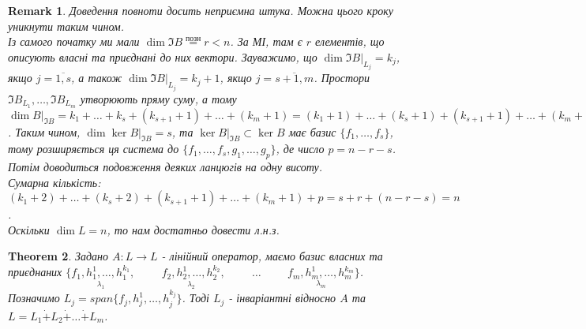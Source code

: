 \documentclass[a4paper, 10pt]{article}
\theoremstyle{theoremdd}
\newtheorem{theorem}{Theorem}[subsection]
\newtheorem{remark}[theorem]{Remark}
\begin{document}
\begin{remark}
Доведення повноти досить неприємна штука. Можна цього кроку уникнути таким чином.\\
Із самого початку ми мали $\dim \Im B \overset{\text{позн}}{=} r < n$. За МІ, там є $r$ елементів, що описують власні та приєднані до них вектори. Зауважимо, що $\dim \Im B|_{L_j} = k_j$, якщо $j = \overline{1,s}$, а також $\dim \Im B|_{L_j} = k_j + 1$, якщо $j = \overline{s+1,m}$. Простори $\Im B_{L_1},\dots, \Im B_{L_m}$ утворюють пряму суму, а тому $\dim B|_{\Im B} = k_1 + \dots + k_s + (k_{s+1}+1) + \dots + (k_m+1) = (k_1 + 1) + \dots + (k_s + 1) + (k_{s+1}+1) + \dots + (k_m+1) - s = r - s$. Таким чином, $\dim \ker B|_{\Im B} = s$, та $\ker B|_{\Im B} \subset \ker B$ має базис $\{f_1,\dots,f_s\}$, тому розширяється ця система до $\{f_1,\dots,f_s, g_1,\dots,g_p\}$, де число $p = n-r-s$.\\
Потім доводиться подовження деяких ланцюгів на одну висоту.\\
Сумарна кількість: $(k_1+2)+ \dots + (k_s+2) + (k_{s+1}+1) + \dots + (k_m+1) + p = s+r + (n-r-s) = n$.\\
Оскільки $\dim L = n$, то нам достатньо довести л.н.з.
\end{remark}

\begin{theorem}
Задано $A: L \to L$ - лінійний оператор, маємо базис власних та приєднаних $\{\underset{\lambda_1}{f_1, h_1^1, \dots ,h_1^{k_1}}, \hspace{1cm} \underset{\lambda_2}{f_2, h_2^1, \dots, h_2^{k_2}}, \hspace{1cm} \dots \hspace{1cm} \underset{\lambda_m}{f_m, h_m^{1}, \dots, h_m^{k_m}}\}$.\\
Позначимо $L_j = span\{f_j, h_j^1,\dots, h_j^{k_j}\}$. Тоді $L_j$ - інваріантні відносно $A$ та $L = L_1 \dot{+} L_2 \dot{+} \dots \dot{+} L_m$.
\end{theorem}
\end{document}
